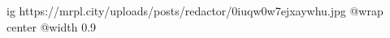  
 
 
 
 

\ifcmt
  ig https://mrpl.city/uploads/posts/redactor/0iuqw0w7ejxaywhu.jpg
  @wrap center
  @width 0.9
\fi

